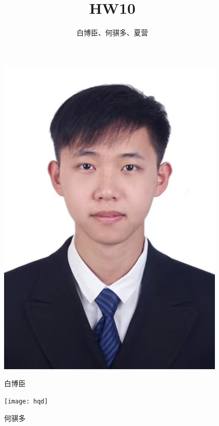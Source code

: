 \documentclass[UTF8]{ctexart}
\begin{document}
	\title{\textbf{HW10}}
	\author{白博臣、何骐多、夏营}
	\date{}
	\maketitle

    \begin{figure}[h]
        \centering
        \begin{minipage}{0.32\textwidth}
            \centering
            \includegraphics[width=\linewidth]{bbc}
            \caption{白博臣}
            \label{fig:img1}
        \end{minipage}\hfill
        \begin{minipage}{0.305\textwidth}
            \centering
            \texttt{[image: hqd]}
            \caption{何骐多}
            \label{fig:img2}
        \end{minipage}\hfill

\end{figure}
\end{document}
